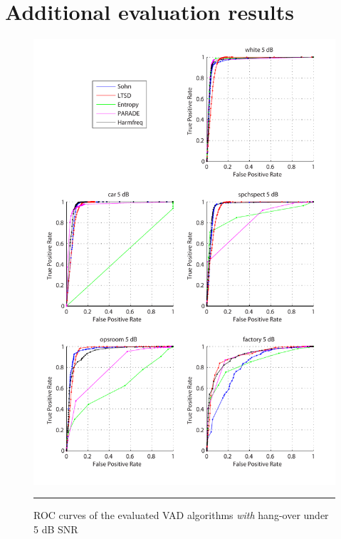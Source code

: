 
\chapter{Additional evaluation results} %

\label{AppendixA} %


\begin{figure}[htbp]
	\centering
		\includegraphics[width=1.0\columnwidth]{Figures/Chapter3/5dBh.pdf}
		\rule{37em}{0.5pt}
	\caption[ROC curves of the evaluated algorithms \emph{with} hang-over under 5 dB SNR]{ROC curves of the evaluated VAD algorithms \emph{with} hang-over under 5 dB SNR}
	\label{fig:5dBh}
\end{figure}

